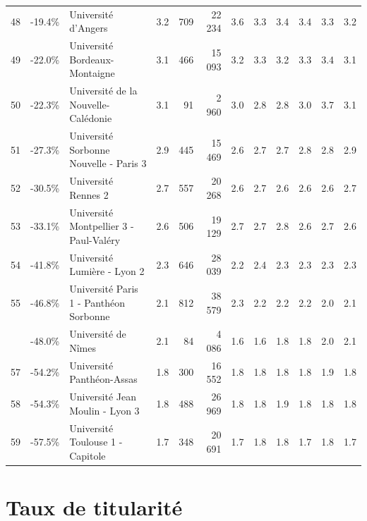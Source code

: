 \documentclass[11pt,french,landscape]{article}
\begin{document}
\begin{longtable}{rrlrrrrrrlrr}
48 & -19.4\% & Université d'Angers & 3.2 & 709 & 22 234 & 3.6 & 3.3 & 3.4 & 3.4 & 3.3 & 3.2\\
\rowcolor{gray!6}  49 & -22.0\% & Université Bordeaux-Montaigne & 3.1 & 466 & 15 093 & 3.2 & 3.3 & 3.2 & 3.3 & 3.4 & 3.1\\
50 & -22.3\% & Université de la Nouvelle-Calédonie & 3.1 & 91 & 2 960 & 3.0 & 2.8 & 2.8 & 3.0 & 3.7 & 3.1\\
\addlinespace
\rowcolor{gray!6}  51 & -27.3\% & Université Sorbonne Nouvelle - Paris 3 & 2.9 & 445 & 15 469 & 2.6 & 2.7 & 2.7 & 2.8 & 2.8 & 2.9\\
52 & -30.5\% & Université Rennes 2 & 2.7 & 557 & 20 268 & 2.6 & 2.7 & 2.6 & 2.6 & 2.6 & 2.7\\
\rowcolor{gray!6}  53 & -33.1\% & Université Montpellier 3 - Paul-Valéry & 2.6 & 506 & 19 129 & 2.7 & 2.7 & 2.8 & 2.6 & 2.7 & 2.6\\
54 & -41.8\% & Université Lumière - Lyon 2 & 2.3 & 646 & 28 039 & 2.2 & 2.4 & 2.3 & 2.3 & 2.3 & 2.3\\
\rowcolor{gray!6}  55 & -46.8\% & Université Paris 1 - Panthéon Sorbonne & 2.1 & 812 & 38 579 & 2.3 & 2.2 & 2.2 & 2.2 & 2.0 & 2.1\\
\addlinespace
56 & -48.0\% & Université de Nîmes & 2.1 & 84 & 4 086 & 1.6 & 1.6 & 1.8 & 1.8 & 2.0 & 2.1\\
\rowcolor{gray!6}  57 & -54.2\% & Université Panthéon-Assas & 1.8 & 300 & 16 552 & 1.8 & 1.8 & 1.8 & 1.8 & 1.9 & 1.8\\
58 & -54.3\% & Université Jean Moulin - Lyon 3 & 1.8 & 488 & 26 969 & 1.8 & 1.8 & 1.9 & 1.8 & 1.8 & 1.8\\
\rowcolor{gray!6}  59 & -57.5\% & Université Toulouse 1 - Capitole & 1.7 & 348 & 20 691 & 1.7 & 1.8 & 1.8 & 1.7 & 1.8 & 1.7\\*
\end{longtable}

\newpage

\hypertarget{taux-de-titularituxe9}{%
\section{Taux de titularité}\label{taux-de-titularituxe9}}
\end{document}
